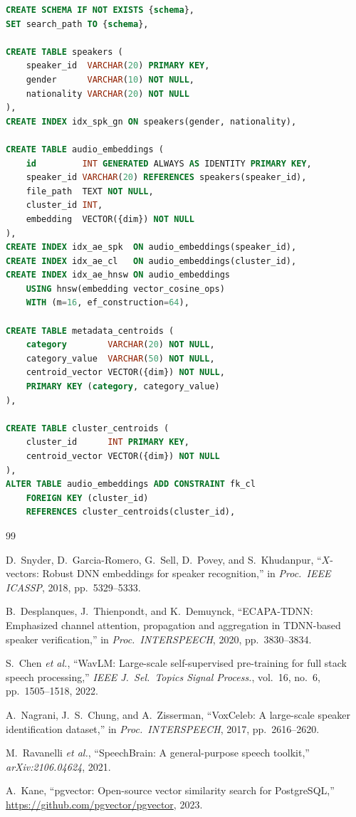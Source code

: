 \documentclass[12pt, a4paper]{article}
\begin{document}
\begin{lstlisting}[language=SQL,
  caption={Schema template (data\_base/schema.template.sql).}]
CREATE SCHEMA IF NOT EXISTS {schema},
SET search_path TO {schema},

CREATE TABLE speakers (
    speaker_id  VARCHAR(20) PRIMARY KEY,
    gender      VARCHAR(10) NOT NULL,
    nationality VARCHAR(20) NOT NULL
),
CREATE INDEX idx_spk_gn ON speakers(gender, nationality),

CREATE TABLE audio_embeddings (
    id         INT GENERATED ALWAYS AS IDENTITY PRIMARY KEY,
    speaker_id VARCHAR(20) REFERENCES speakers(speaker_id),
    file_path  TEXT NOT NULL,
    cluster_id INT,
    embedding  VECTOR({dim}) NOT NULL
),
CREATE INDEX idx_ae_spk  ON audio_embeddings(speaker_id),
CREATE INDEX idx_ae_cl   ON audio_embeddings(cluster_id),
CREATE INDEX idx_ae_hnsw ON audio_embeddings
    USING hnsw(embedding vector_cosine_ops)
    WITH (m=16, ef_construction=64),

CREATE TABLE metadata_centroids (
    category        VARCHAR(20) NOT NULL,
    category_value  VARCHAR(50) NOT NULL,
    centroid_vector VECTOR({dim}) NOT NULL,
    PRIMARY KEY (category, category_value)
),

CREATE TABLE cluster_centroids (
    cluster_id      INT PRIMARY KEY,
    centroid_vector VECTOR({dim}) NOT NULL
),
ALTER TABLE audio_embeddings ADD CONSTRAINT fk_cl
    FOREIGN KEY (cluster_id)
    REFERENCES cluster_centroids(cluster_id),
\end{lstlisting}

\clearpage
\begin{thebibliography}{99}

D.\ Snyder, D.\ Garcia-Romero, G.\ Sell, D.\ Povey, and S.\ Khudanpur,
``$X$-vectors: Robust DNN embeddings for speaker recognition,''
in \textit{Proc.\ IEEE ICASSP}, 2018, pp.~5329--5333.

B.\ Desplanques, J.\ Thienpondt, and K.\ Demuynck,
``ECAPA-TDNN: Emphasized channel attention, propagation and aggregation
in TDNN-based speaker verification,''
in \textit{Proc.\ INTERSPEECH}, 2020, pp.~3830--3834.

S.\ Chen \textit{et al.},
``WavLM: Large-scale self-supervised pre-training for full stack speech processing,''
\textit{IEEE J.\ Sel.\ Topics Signal Process.}, vol.~16, no.~6,
pp.~1505--1518, 2022.

A.\ Nagrani, J.\ S.\ Chung, and A.\ Zisserman,
``VoxCeleb: A large-scale speaker identification dataset,''
in \textit{Proc.\ INTERSPEECH}, 2017, pp.~2616--2620.

M.\ Ravanelli \textit{et al.},
``SpeechBrain: A general-purpose speech toolkit,''
\textit{arXiv:2106.04624}, 2021.


A.\ Kane,
``pgvector: Open-source vector similarity search for PostgreSQL,''
\url{https://github.com/pgvector/pgvector}, 2023.

\end{thebibliography}
\end{document}
